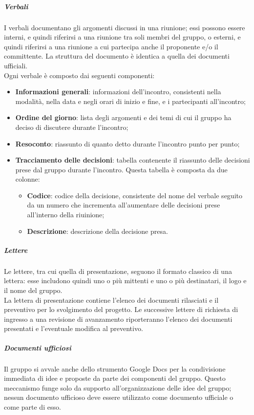 \documentclass[../norme-di-progetto.tex]{subfiles}
\begin{document}
\subparagraph*{Verbali}
I verbali documentano gli argomenti discussi in una riunione; essi possono essere interni, e quindi riferirsi a una riunione tra soli membri del gruppo, o esterni, e quindi riferirsi a una riunione a cui partecipa anche il proponente e/o il committente. La struttura del documento è identica a quella dei documenti ufficiali. \\
Ogni verbale è composto dai seguenti componenti:
\begin{itemize}
  \item \textbf{Informazioni generali}: informazioni dell'incontro, consistenti nella modalità, nella data e negli orari di inizio e fine, e i partecipanti all'incontro;
  \item \textbf{Ordine del giorno}: lista degli argomenti e dei temi di cui il gruppo ha deciso di discutere durante l'incontro;
  \item \textbf{Resoconto}: riassunto di quanto detto durante l'incontro punto per punto;
  \item \textbf{Tracciamento delle decisioni}: tabella contenente il riassunto delle decisioni prese dal gruppo durante l'incontro. Questa tabella è composta da due colonne:
  \begin{itemize}
    \item \textbf{Codice}: codice della decisione, consistente del nome del verbale seguito da un numero che incrementa all'aumentare delle decisioni prese all'interno della riuinione;
    \item \textbf{Descrizione}: descrizione della decisione presa.
  \end{itemize}
\end{itemize}

\subparagraph*{Lettere}
Le lettere, tra cui quella di presentazione, seguono il formato classico di una lettera: esse includono quindi uno o più mittenti e uno o più destinatari, il logo e il nome del gruppo. \\
La lettera di presentazione contiene l'elenco dei documenti rilasciati e il preventivo per lo svolgimento del progetto. Le successive lettere di richiesta di ingresso a una revisione di avanzamento riporteranno l'elenco dei documenti presentati e l'eventuale modifica al preventivo.

\subparagraph*{Documenti ufficiosi}
Il gruppo si avvale anche dello strumento Google Docs per la condivisione immediata di idee e proposte da parte dei componenti del gruppo. Questo meccanismo funge solo da supporto all'organizzazione delle idee del gruppo; nessun documento ufficioso deve essere utilizzato come documento ufficiale o come parte di esso.
\end{document}
